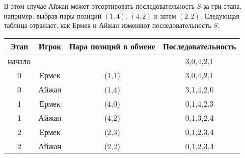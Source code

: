 В этом случае Айжан может отсортировать последовательность $S$ за три этапа, например,
выбрав пары позиций $(1,4)$, $(4,2)$ и затем $(2,2)$. Следующая таблица отражает, как Ермек и
Айжан изменяют последовательность $S$.
\begin{center}
\begin{tabular}{|c|c|c|c|}
\hline
Этап & Игрок & Пара позиций в обмене &  Последовательность\\
\hline
начало & & & 3,0,4,2,1 \\
\hline
0 & Ермек & (1,1) & 3,0,4,2,1 \\
\hline
0 & Айжан & (1,4) & 3,1,4,2,0 \\
\hline
1 & Ермек & (4,0) & 0,1,4,2,3 \\
\hline
1 & Айжан & (4,2) & 0,1,3,2,4 \\
\hline
2 & Ермек & (2,3) & 0,1,2,3,4 \\
\hline
2 & Айжан & (2,2) & 0,1,2,3,4\\
\hline
\end{tabular}
\end{center}